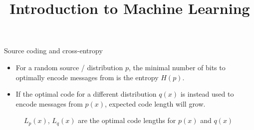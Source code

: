 \documentclass[11pt,compress,t,notes=noshow, xcolor=table]{beamer}
\title{Introduction to Machine Learning}
\begin{document}
    

\begin{vbframe} {Source coding and cross-entropy}

\begin{itemize}
  \item For a random source / distribution $p$, the minimal number of bits to optimally encode messages from is the entropy $H(p)$.
  \item If the optimal code for a different distribution $q(x)$ is instead used to encode messages from $p(x)$, expected code length will grow.
\end{itemize}
  \vspace{-0.3cm}
  \begin{figure}
    \centering
      \caption{\footnotesize{$L_p(x)$, $L_q(x)$ are the optimal code lengths for $p(x)$ and $q(x)$}}
  \end{figure}


\end{vbframe}
\end{document}
